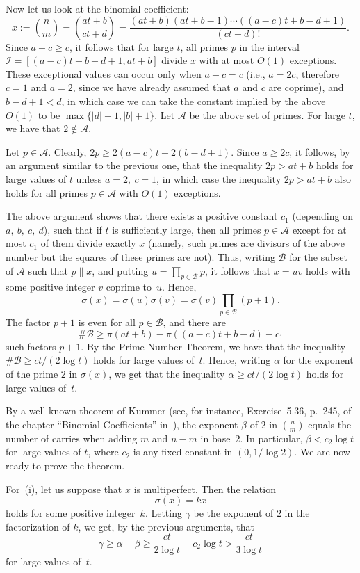 \documentclass[twoside,amsthm]{elsart}
\def\cA{\mathcal{A}}
\def\cB{\mathcal{B}}
\def\cI{\mathcal{I}}
\begin{document}
Now let us look at the binomial coefficient:
$$
x := \binom{n}{m} = \binom{at+b}{ct+d} = \frac{(at+b)(at+b-1) \cdots
((a-c)t+b-d+1)}{(ct+d)!}.
$$
Since $a-c\ge c$, it follows that for large $t$, all primes $p$ in
the interval $\cI = [(a-c)t+b-d+1, at+b]$ divide $x$ with at
most $O(1)$ exceptions. These exceptional values can occur only when
$a-c=c$ (i.e., $a=2c$, therefore $c=1$ and $a=2$, since we have
already assumed that $a$ and $c$ are coprime), and $b-d+1<d$, in
which case we can take the constant implied by the above $O(1)$ to
be $\max\{|d|+1,|b|+1\}$. Let $\cA$ be the above set of primes. For
large $t$, we have that $2\notin \cA$.

Let $p\in \cA$. Clearly, $2p\ge 2(a-c)t+2(b-d+1)$. Since $a\ge 2c$,
it follows, by an argument similar to the previous one, that the
inequality $2p>at+b$ holds for large values of $t$ unless
$a=2,~c=1$, in which case the inequality $2p>at+b$ also holds for
all primes $p\in \cA$ with $O(1)$ exceptions.

The above argument shows that there exists a positive constant $c_1$
(depending on $a,~b,~c,~d$), such that if $t$ is sufficiently large,
then all primes $p\in \cA$ except for at most $c_1$ of them divide
exactly $x$ (namely, such primes are divisors of the above number
but the squares of these primes are not). Thus, writing $\cB$ for
the subset of $\cA$ such that $p\parallel x$, and putting $u =
\prod_{p \in \cB} p$, it follows that $x = uv$ holds with some
positive integer $v$ coprime to~$u$. Hence,
$$
\sigma(x) = \sigma(u)\sigma(v) = \sigma(v)\prod_{p \in \cB} (p+1).
$$
The factor $p+1$ is even for all $p\in \cB$, and there are
$$
\#\cB \ge \pi(at+b) - \pi((a-c)t+b-d)-c_1
$$
such factors $p+1$. By the Prime Number Theorem, we have that the
inequality $\#\cB\ge ct/(2\log t)$ holds for large values of~$t$.
Hence, writing $\alpha$ for the exponent of the prime $2$ in
$\sigma(x)$, we get that the inequality $\alpha\ge ct/(2\log t)$
holds for large values of~$t$.

By a well-known theorem of Kummer (see, for instance,
Exercise~5.36, p.~245, of the chapter ``Binomial Coefficients''
in~\cite{GKP}),
the exponent $\beta$ of $2$ in
$\binom{n}{m}$ equals the number of carries when adding $m$ and
$n-m$ in base~$2$. In particular, $\beta<c_2 \log t$ for large
values of $t$, where $c_2$ is any fixed constant in $(0,1/\log 2)$.
We are now ready to prove the theorem.

For~(i), let us suppose that $x$ is multiperfect. Then the relation
$$
\sigma(x) = kx
$$
holds for some positive integer~$k$. Letting $\gamma$ be the
exponent of $2$ in the factorization of $k$, we get, by the previous
arguments, that
\begin{equation}
\label{eq:orderof2ink} 
\gamma \ge \alpha-\beta\ge \frac{ct}{2\log t}
- c_2\log t>\frac{ct}{3\log t}
\end{equation}
for large values of~$t$.
\end{document}
